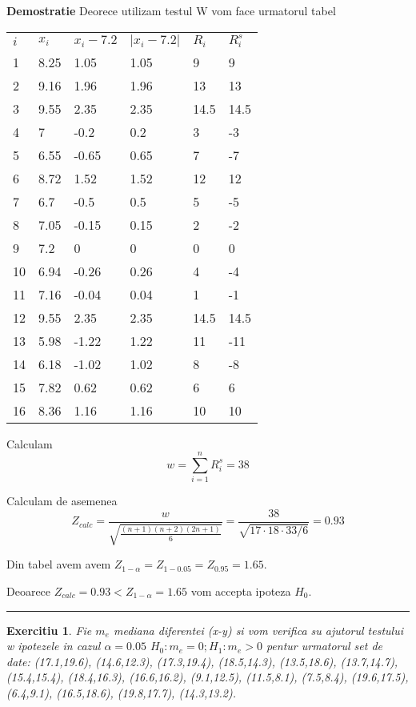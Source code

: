 \documentclass{article}
\newtheorem{exercise}[theorem]{Exercitiu}
\newenvironment{proof}[1][Proof]{\noindent\textbf{Demostratie} }{\ \rule{0.5em}{0.5em}}
\begin{document}
\begin{proof}
Deorece utilizam testul W vom face urmatorul tabel

\begin{tabular}{llllll}
$i$ & $x_{i}$ & $x_{i}-7.2$ & $\left\vert x_{i}-7.2\right\vert $ & $R_{i}$ & 
$R_{i}^{s}$ \\ 
1 & 8.25 & 1.05 & 1.05 & 9 & 9 \\ 
2 & 9.16 & 1.96 & 1.96 & 13 & 13 \\ 
3 & 9.55 & 2.35 & 2.35 & 14.5 & 14.5 \\ 
4 & 7 & -0.2 & 0.2 & 3 & -3 \\ 
5 & 6.55 & -0.65 & 0.65 & 7 & -7 \\ 
6 & 8.72 & 1.52 & 1.52 & 12 & 12 \\ 
7 & 6.7 & -0.5 & 0.5 & 5 & -5 \\ 
8 & 7.05 & -0.15 & 0.15 & 2 & -2 \\ 
9 & 7.2 & 0 & 0 & 0 & 0 \\ 
10 & 6.94 & -0.26 & 0.26 & 4 & -4 \\ 
11 & 7.16 & -0.04 & 0.04 & 1 & -1 \\ 
12 & 9.55 & 2.35 & 2.35 & 14.5 & 14.5 \\ 
13 & 5.98 & -1.22 & 1.22 & 11 & -11 \\ 
14 & 6.18 & -1.02 & 1.02 & 8 & -8 \\ 
15 & 7.82 & 0.62 & 0.62 & 6 & 6 \\ 
16 & 8.36 & 1.16 & 1.16 & 10 & 10%
\end{tabular}

Calculam%
\[
w=\sum_{i=1}^{n}R_{i}^{s}=38
\]

Calculam de asemenea%
\[
Z_{calc}=\frac{w}{\sqrt{\frac{(n+1)(n+2)(2n+1)}{6}}}=\frac{38}{\sqrt{17\cdot
18\cdot 33/6}}=0.93
\]

Din tabel avem avem $Z_{1-\alpha }=Z_{1-0.05}=Z_{0.95}=1.65$.

Deoarece $Z_{calc}=0.93<Z_{1-\alpha }=1.65$ vom accepta ipoteza $H_{0}$.
\end{proof}

\begin{exercise}
Fie $m_{e}$ mediana diferentei (x-y) si vom verifica su ajutorul testului w
ipotezele in cazul $\alpha =0.05$ $H_{0}:m_{e}=0;H_{1}:m_{e}>0$ pentur
urmatorul set de date: (17.1,19.6), (14.6,12.3), (17.3,19.4), (18.5,14.3),
(13.5,18.6), (13.7,14.7), (15.4,15.4), (18.4,16.3), (16.6,16.2), (9.1,12.5),
(11.5,8.1), (7.5,8.4), (19.6,17.5), (6.4,9.1), (16.5,18.6), (19.8,17.7),
(14.3,13.2).
\end{exercise}
\end{document}

